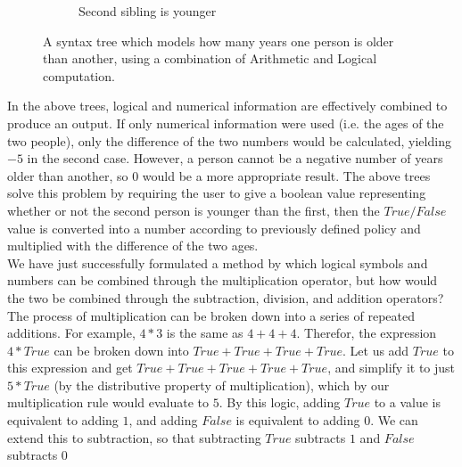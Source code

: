 \documentclass{article}
\begin{document}
\begin{figure}[H]
\begin{subfigure}{1.0\textwidth}
			
			\caption{Second sibling is younger}
			
		\end{subfigure}
		
		\caption{A syntax tree which models how many years one person is older than another, using a combination of Arithmetic and Logical computation.} 
	\end{figure}
	
	
	In the above trees, logical and numerical information are effectively combined to produce an output. If only numerical information were used (i.e. the ages of the two people), only the difference of the two numbers would be calculated, yielding $-5$ in the second case. However, a person cannot be a negative number of years older than another, so $0$ would be a more appropriate result. The above trees solve this problem by requiring the user to give a boolean value representing whether or not the second person is younger than the first, then the $True/False$ value is converted into a number according to previously defined policy and multiplied with the difference of the two ages. \\
	
	We have just successfully formulated a method by which logical symbols and numbers can be combined through the multiplication operator, but how would the two be combined through the subtraction, division, and addition operators? \\
	
	The process of multiplication can be broken down into a series of repeated additions. For example, $4 * 3$ is the same as $4 + 4 + 4$. Therefor, the expression $4 * True$ can be broken down into $True + True + True + True$. Let us add $True$ to this expression and get $True + True + True + True + True$, and simplify it to just $5 * True$ (by the distributive property of multiplication), which by our multiplication rule would evaluate to $5$. By this logic, adding $True$ to a value is equivalent to adding $1$, and adding $False$ is equivalent to adding $0$. We can extend this to subtraction, so that subtracting $True$ subtracts $1$ and $False$ subtracts $0$ \\
	
\end{document}
